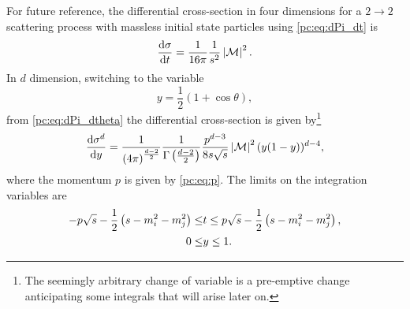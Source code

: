 \documentclass[../main.tex]{subfiles}
\begin{document}
For future reference, the differential cross-section in four dimensions for a \(2\to 2\) scattering process with massless initial state particles using \cref{pc:eq:dPi_dt} is
\begin{equation}
  \label{pc:eq:dsigma_dt}
  \d[t]{\sigma} = \frac{1}{16\pi} \frac{1}{s^2} \abs{\M}^2.
\end{equation}
In \(d\) dimension, switching to the variable
\begin{equation}
  y = \frac{1}{2}(1+\cos\theta),
\end{equation}
from \cref{pc:eq:dPi_dtheta} the differential cross-section is given by\footnote{The seemingly arbitrary change of variable is a pre-emptive change anticipating some integrals that will arise later on.}
\begin{equation}
  \label{pc:eq:dsigma_dy}
  \d[y]{\sigma^d} = \frac{1}{\pclosed{4\pi}^{\frac{d-2}{2}}} \frac{1}{\Gamma\pclosed{\frac{d-2}{2}}} \frac{p^{d-3}}{8s\sqrt{s}} \abs{\M}^2 (y(1-y))^{d-4},
\end{equation}
where the momentum \(p\) is given by \cref{pc:eq:p}.
The limits on the integration variables are
\begin{subequations}
  \label{pc:eq:kinematic_limits}
  \begin{align}
    -p\sqrt{s} - \frac{1}{2}\left(s - m_i^2 - m_j^2\right) \leq & t \leq p\sqrt{s} - \frac{1}{2}\left(s - m_i^2 - m_j^2\right), \\
    0 \leq                                                   & y \leq 1.
  \end{align}
\end{subequations}



\end{document}

